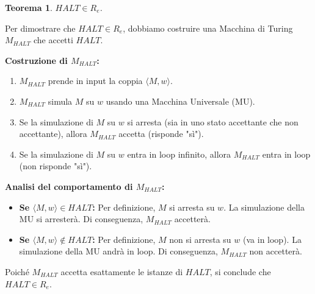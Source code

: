 \documentclass[a4paper]{article}
\makeatletter
\newtheorem{theorem}{Teorema}[section] %
\renewenvironment{proof}[1][\proofname]{\par
  \pushQED{\qed}%
  \normalfont \topsep6\p@\@plus6\p@\relax
  \trivlist
  \item[\hskip\labelsep
        \bfseries
    #1\@addpunct{.}]\ignorespaces
}{%
  \popQED\endtrivlist\@endpefalse
}
\makeatother
\begin{document}
\begin{theorem}
$HALT \in R_e$.
\end{theorem}
\begin{proof}
Per dimostrare che $HALT \in R_e$, dobbiamo costruire una Macchina di Turing $M_{HALT}$ che accetti $HALT$.

\textbf{Costruzione di $M_{HALT}$:}
\begin{enumerate}
    \item $M_{HALT}$ prende in input la coppia $\langle M, w \rangle$.
    \item $M_{HALT}$ simula $M$ su $w$ usando una Macchina Universale (MU).
    \item Se la simulazione di $M$ su $w$ si arresta (sia in uno stato accettante che non accettante), allora $M_{HALT}$ accetta (risponde "sì").
    \item Se la simulazione di $M$ su $w$ entra in loop infinito, allora $M_{HALT}$ entra in loop (non risponde "sì").
\end{enumerate}
\textbf{Analisi del comportamento di $M_{HALT}$:}
\begin{itemize}
    \item \textbf{Se $\langle M, w \rangle \in HALT$:}
    Per definizione, $M$ si arresta su $w$. La simulazione della MU si arresterà. Di conseguenza, $M_{HALT}$ accetterà.
    \item \textbf{Se $\langle M, w \rangle \notin HALT$:}
    Per definizione, $M$ non si arresta su $w$ (va in loop). La simulazione della MU andrà in loop. Di conseguenza, $M_{HALT}$ non accetterà.
\end{itemize}
Poiché $M_{HALT}$ accetta esattamente le istanze di $HALT$, si conclude che $HALT \in R_e$.
\end{proof}
\end{document}

